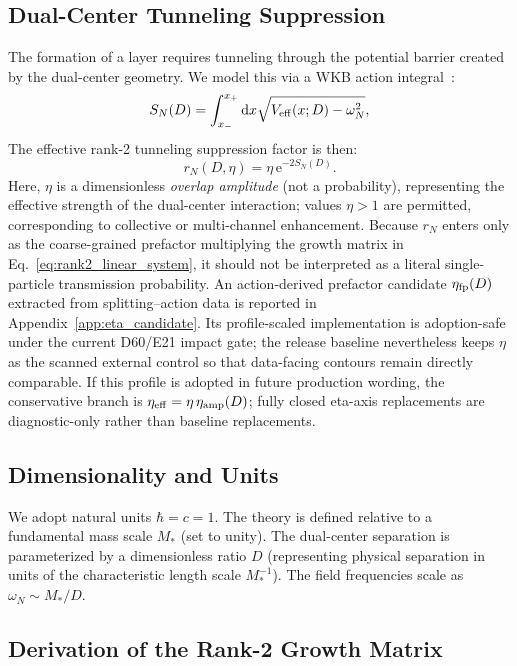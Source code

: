 \documentclass[aps,prd,onecolumn,notitlepage,nofootinbib,superscriptaddress,11pt,floatfix]{revtex4-2}
\newcommand{\dd}{\mathrm{d}}
\newcommand{\ee}{\mathrm{e}}
\begin{document}
\subsection{Dual-Center Tunneling Suppression}
The formation of a layer requires tunneling through the potential barrier created by the dual-center geometry. We model this via a WKB action integral~\cite{BenderOrszag1999,Teschl2014}:
\begin{equation}
S_N(D) = \int_{x_-}^{x_+} \dd x \sqrt{V_{\rm eff}(x; D) - \omega_N^2},
\label{eq:SN}
\end{equation}
The effective rank-2 tunneling suppression factor is then:
\begin{equation}
r_N(D, \eta) = \eta \, \ee^{-2 S_N(D)}.
\label{eq:rN}
\end{equation}
Here, $\eta$ is a dimensionless \emph{overlap amplitude} (not a probability), representing the effective strength of the dual-center interaction; values $\eta > 1$ are permitted, corresponding to collective or multi-channel enhancement. Because $r_N$ enters only as the coarse-grained prefactor multiplying the growth matrix in Eq.~\eqref{eq:rank2_linear_system}, it should not be interpreted as a literal single-particle transmission probability.
An action-derived prefactor candidate $\eta_{\rm fp}(D)$ extracted from splitting--action data is reported in Appendix~\ref{app:eta_candidate}.  Its profile-scaled implementation is adoption-safe under the current D60/E21 impact gate; the release baseline nevertheless keeps $\eta$ as the scanned external control so that data-facing contours remain directly comparable.  If this profile is adopted in future production wording, the conservative branch is $\eta_{\rm eff}=\eta\,\eta_{\rm amp}(D)$; fully closed eta-axis replacements are diagnostic-only rather than baseline replacements.

\subsection{Dimensionality and Units}
We adopt natural units $\hbar = c = 1$. The theory is defined relative to a fundamental mass scale $M_*$ (set to unity). The dual-center separation is parameterized by a dimensionless ratio $D$ (representing physical separation in units of the characteristic length scale $M_*^{-1}$). The field frequencies scale as $\omega_N \sim M_*/D$.

\subsection{Derivation of the Rank-2 Growth Matrix}
\label{sec:rank2_derivation}
\end{document}
